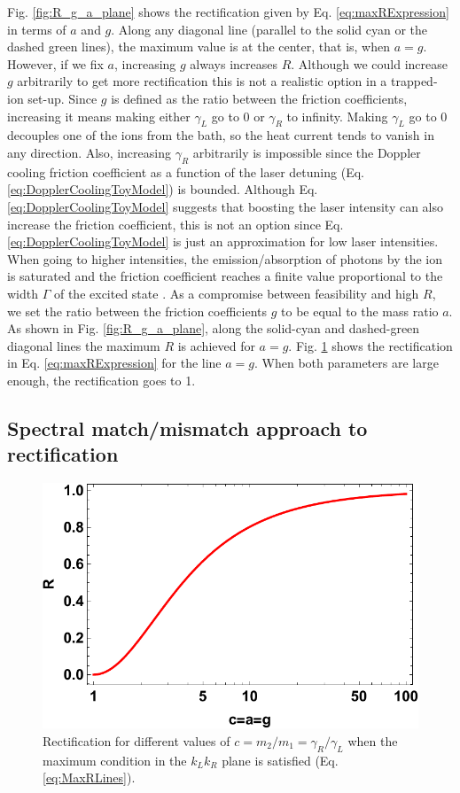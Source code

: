 Fig. \ref{fig:R_g_a_plane} shows the rectification given by Eq. \eqref{eq:maxRExpression} in terms of $a$ and $g$. Along any diagonal line (parallel to the solid cyan or the dashed green lines), the maximum value is at the center, that is, when $a = g$. However, if we fix $a$, increasing $g$ always increases $R$. Although we could increase $g$ arbitrarily to get more rectification this is not a realistic option in a trapped-ion set-up. Since $g$ is defined as the ratio between the friction coefficients, increasing it means making either $\gamma_L$ go to 0 or $\gamma_R$ to infinity. Making $\gamma_L$ go to 0 decouples one of the ions from the bath, so the heat current tends to vanish in any direction. Also, increasing $\gamma_R$ arbitrarily is impossible since the Doppler cooling friction coefficient as a function of the laser detuning (Eq. \eqref{eq:DopplerCoolingToyModel}) is bounded. Although Eq. \eqref{eq:DopplerCoolingToyModel} suggests that boosting the laser intensity can also increase the friction coefficient, this is not an option since Eq. \eqref{eq:DopplerCoolingToyModel} is just an approximation for low laser intensities. When going to higher intensities, the emission/absorption of photons by the ion is saturated and the friction coefficient reaches a finite value proportional to the width $\Gamma$ of the excited state \cite{Metcalf2003}. As a compromise between feasibility and high $R$, we set the ratio between the friction coefficients $g$ to be equal to the mass ratio $a$. As shown  in Fig. \ref{fig:R_g_a_plane}, along the solid-cyan and dashed-green diagonal lines the maximum $R$ is achieved for $a = g$. Fig. \ref{fig:Fig_PerfectRectification} shows the rectification in Eq. \eqref{eq:maxRExpression} for the line $a = g$. When both parameters are large enough, the rectification goes to 1.
%
%
\subsection{Spectral match/mismatch approach to rectification}
%
%
%
\begin{figure}
  \includegraphics[width=\linewidth]{Figures/CC.pdf}
  \caption{Rectification for different values of $c=m_2/m_1=\gamma_R/\gamma_L$ when the maximum condition in the $k_L k_R$ plane is satisfied (Eq. \eqref{eq:MaxRLines}).}
  \label{fig:Fig_PerfectRectification}
\end{figure}

